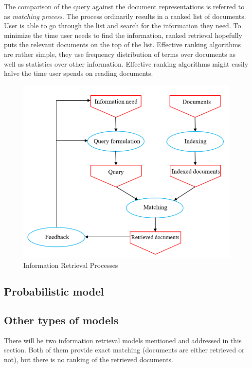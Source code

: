 \documentclass[10pt ,english,a4paper]{article}
\begin{document}
The comparison of the query against the document representations is referred to as \emph{matching process}. The process ordinarily results in a ranked list of documents. User is able to go through the list and search for the information they need. To minimize the time user needs to find the information, ranked retrieval hopefully puts the relevant documents on the top of the list. Effective ranking algorithms are rather simple, they use frequency distribution of terms over documents as well as statistics over other information. Effective ranking algorithms might easily halve the time user spends on reading documents. \cite{hiem09info}

\begin{figure}[tbh]
\centering
\includegraphics[scale=0.75]{figure1.pdf}
\caption{Information Retrieval Processes}
\label{f:process}
\end{figure}

\subsection{Probabilistic model} \label{models:prob}
\cite{hiem09info}
\cite{jones99info}

\subsection{Other types of models} \label{models:other}

There will be two information retrieval models mentioned and addressed in this section. Both of them provide exact matching (documents are either retrieved or not), but there is no ranking of the retrieved documents.
\end{document}

